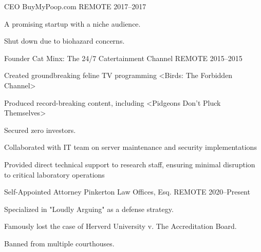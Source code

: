\begin{cventries}
  \cventry
    {CEO} %
    {BuyMyPoop.com} %
    {REMOTE} %
    {2017--2017} %
    {
      \begin{cvitems} %
        \item {A promising startup with a niche audience.}
        \item {Shut down due to biohazard concerns.}
      \end{cvitems}
    }

  \cventry
    {Founder} %
    {Cat Minx: The 24/7 Catertainment Channel} %
    {REMOTE} %
    {2015--2015} %
    {
      \begin{cvitems} %
        \item {Created groundbreaking feline TV programming <Birds: The Forbidden Channel>}
        \item {Produced record-breaking content, including <Pidgeons Don't Pluck Themselves>}
        \item {Secured zero investors.}
        \item {Collaborated with IT team on server maintenance and security implementations}
        \item {Provided direct technical support to research staff, ensuring minimal disruption to critical laboratory operations}
      \end{cvitems}
    }

  \cventry
    {Self-Appointed Attorney} %
    {Pinkerton Law Offices, Esq.} %
    {REMOTE} %
    {2020--Present} %
    {
      \begin{cvitems} %
        \item{Specialized in "Loudly Arguing" as a defense strategy.}
        \item{Famously lost the case of Herverd University v. The Accreditation Board.}
        \item{Banned from multiple courthouses.}
      \end{cvitems}
    }
\end{cventries}
